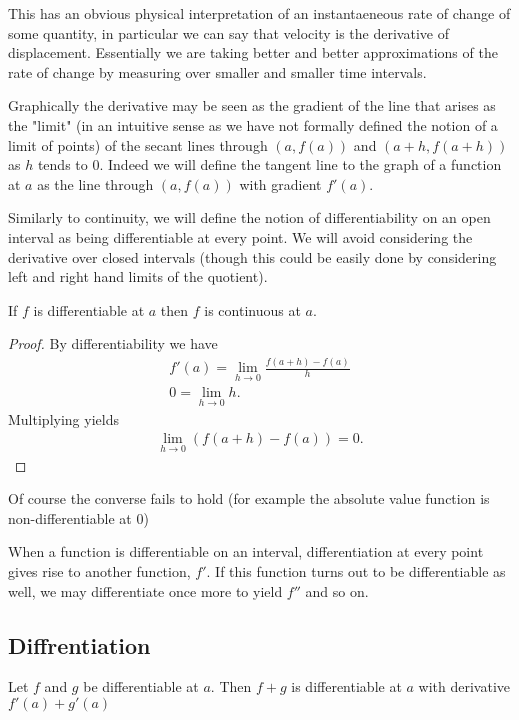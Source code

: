 \documentclass[]{article}
\begin{document}
This has an obvious physical interpretation of an instantaeneous rate of change of some quantity, in particular we can say that velocity is the derivative of displacement. Essentially we are taking better and better approximations of the rate of change by measuring over smaller and smaller time intervals.

Graphically the derivative may be seen as the gradient of the line that arises as the "limit" (in an intuitive sense as we have not formally defined the notion of a limit of points) of the secant lines through $(a, f(a))$ and $(a+h, f(a+h))$ as $h$ tends to $0$. Indeed we will define the tangent line to the graph of a function at $a$ as the line through $(a,f(a))$ with gradient $f'(a)$.

Similarly to continuity, we will define the notion of differentiability on an open interval as being differentiable at every point. We will avoid considering the derivative over closed intervals (though this could be easily done by considering left and right hand limits of the quotient).

\begin{thm} 
	If $f$ is differentiable at $a$ then $f$ is continuous at $a$.	
\end{thm}

\begin{proof}
		By differentiability we have 
		\begin{align*}
				f'(a) = \lim_{h\to 0} \frac{f(a+h)-f(a)}{h} \\
				0 = \lim_{h\to 0} h.
		\end{align*}
		Multiplying yields
		\begin{align*}
				\lim_{h \to 0} (f(a+h) - f(a)) = 0.
		\end{align*}
\end{proof}

Of course the converse fails to hold (for example the absolute value function is non-differentiable at $0$) 

When a function is differentiable on an interval, differentiation at every point gives rise to another function, $f'$. If this function turns out to be differentiable as well, we may differentiate once more to yield $f'' $ and so on. 

\subsection{Diffrentiation}

\begin{thm} 
		Let $f$ and $g$ be differentiable at $a$. Then $f+g$ is differentiable at $a$ with derivative $f'(a) + g'(a)$	
\end{thm}
\end{document}

